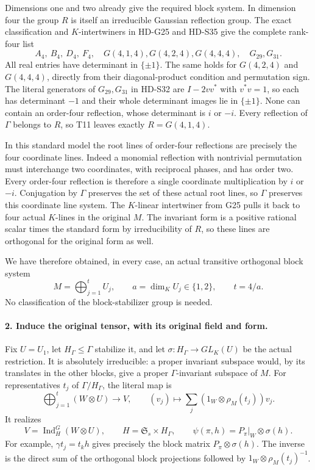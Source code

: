 Dimensions one and two already give the required block
system. In dimension four the group \(R\) is itself an
irreducible Gaussian reflection group. The exact classification
and \(K\)-intertwiners in HD-G25 and HD-S35 give the complete
rank-four list
\[
 A_4,\ B_4,\ D_4,\ F_4,\quad
 G(4,1,4),G(4,2,4),G(4,4,4),\quad G_{29},G_{31}.
 \tag{F1T12.2}
\]
All real entries have determinant in \(\{\pm1\}\).
The same holds for \(G(4,2,4)\) and \(G(4,4,4)\), directly
from their diagonal-product condition and permutation sign.
The literal generators of \(G_{29},G_{31}\) in HD-S32 are
\(I-2vv^*\) with \(v^*v=1\), so each has determinant
\(-1\) and their whole determinant images lie in
\(\{\pm1\}\). None can contain an order-four reflection,
whose determinant is \(i\) or \(-i\).
Every reflection of \(\Gamma\) belongs to \(R\), so T11
leaves exactly \(R=G(4,1,4)\).

In this standard model the root lines of order-four
reflections are precisely the four coordinate lines.
Indeed a monomial reflection with nontrivial permutation
must interchange two coordinates, with reciprocal phases,
and has order two. Every order-four reflection is therefore
a single coordinate multiplication by \(i\) or \(-i\).
Conjugation by \(\Gamma\) preserves the set of these actual
root lines, so \(\Gamma\) preserves this coordinate line
system. The \(K\)-linear intertwiner from G25 pulls it back
to four actual \(K\)-lines in the original \(M\).
The invariant form is a positive rational scalar times the
standard form by irreducibility of \(R\), so these lines
are orthogonal for the original form as well.

We have therefore obtained, in every case, an actual
transitive orthogonal block system
\[
 M=\bigoplus_{j=1}^{t}U_j,\qquad
 a=\dim_K U_j\in\{1,2\},\qquad t=4/a .
 \tag{F1T12.3}
\]
No classification of the block-stabilizer group is needed.

\paragraph{2. Induce the original tensor, with its original field and form.}
Fix \(U=U_1\), let \(H_\Gamma\le\Gamma\) stabilize it,
and let \(\sigma:H_\Gamma\to GL_K(U)\) be the actual
restriction. It is absolutely irreducible: a proper
invariant subspace would, by its translates in the other
blocks, give a proper \(\Gamma\)-invariant subspace of \(M\).
For representatives \(t_j\) of \(\Gamma/H_\Gamma\), the
literal map is
\[
 \bigoplus_{j=1}^{t}(W\otimes U)\longrightarrow V,\qquad
       (v_j)\longmapsto
            \sum_j(1_W\otimes\rho_M(t_j))v_j .
 \tag{F1T12.4}
\]
It realizes
\[
 V=\operatorname{Ind}_{H}^{G}(W\otimes U),\qquad
 H=\mathfrak S_s\times H_\Gamma,\qquad
 \psi(\pi,h)=P_\pi|_W\otimes\sigma(h).
 \tag{F1T12.5}
\]
For example, \(\gamma t_j=t_k h\) gives precisely the
block matrix \(P_\pi\otimes\sigma(h)\). The inverse is
the direct sum of the orthogonal block projections followed
by \(1_W\otimes\rho_M(t_j)^{-1}\).

